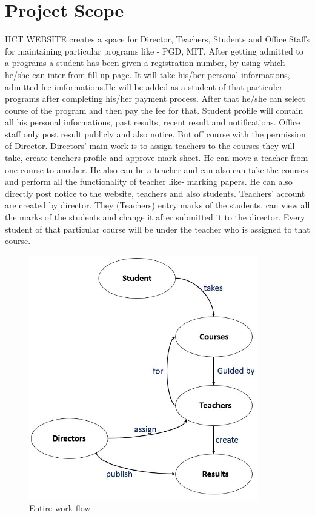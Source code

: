 \documentclass[../main.tex]{subfiles}
\begin{document}
\section{Project Scope}
IICT WEBSITE creates a space for Director, Teachers, Students and Office Staffs for maintaining particular programs like - PGD, MIT.\@
\newline
After getting admitted to a programs a student has been given a registration number, by using which he/she can inter from-fill-up page. It will take his/her personal informations, admitted fee imformations.He will be added as a student of that particuler programs after completing his/her payment process. After that he/she can select course of the program and then pay the fee for that. Student profile will contain all his personal informations, past results, recent result and notifications.
\newline
Office staff only post result publicly and also notice. But off course with the permission of Director.  
\newline
Directors' main work is to assign teachers to the courses they will take, create teachers profile and approve mark-sheet. He can move a teacher from one course to another. He also can be a teacher and can also can take the courses and perform all the functionality of teacher like- marking papers. He can also directly post notice to the website, teachers and also students.
\newline
Teachers' account are created by director. They (Teachers) entry marks of the students, can view all the marks of the students and change it after submitted it to the director. Every student of that particular course will be under the teacher who is assigned to that course. 
\newline
\begin{figure}
    \centering
    \includegraphics[width=10cm]{../assets/1.JPG}
    \caption{Entire work-flow}
    \label{fig:IICT_WEBSITE}
\end{figure}
\end{document}
